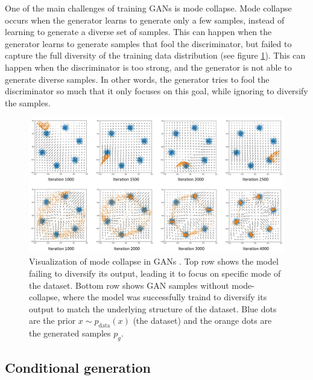 One of the main challenges of training GANs is mode collapse. Mode collapse occurs when the generator learns to generate only a few samples, instead of learning to generate a diverse set of samples. This can happen when the generator learns to generate samples that fool the discriminator, but failed to capture the full diversity of the training data distribution (see figure \ref{fig:gan_mode_collapse}). This can happen when the discriminator is too strong, and the generator is not able to generate diverse samples. In other words, the generator tries to fool the discriminator so much that it only focuses on this goal, while ignoring to diversify the samples.

\begin{figure}
    \centering
    \includegraphics[width=\textwidth]{images/gan/gan_mode_collapse.png}
    \caption{Visualization of mode collapse in GANs \cite{gan_mode_collapse_image_source}. Top row shows the model failing to diversify its output, leading it to focus on specific mode of the dataset. Bottom row shows GAN samples without mode-collapse, where the model was successfully traind to diversify its output to match the underlying structure of the dataset. Blue dots are the prior $x \sim p_{\text{data}}(x)$ (the dataset) and the orange dots are the generated samples $p_g$.}
    \label{fig:gan_mode_collapse}
\end{figure}




\subsection{Conditional generation}
\label{subsec:gan_conditional_generation}

